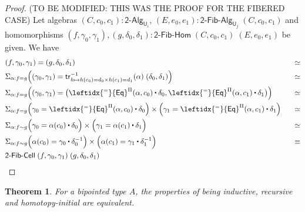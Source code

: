 \documentclass[reqno,10pt,a4paper,oneside]{amsart}
\newcommand{\sm}[1]{\Sigma_{#1}}
\newcommand{\happly}{\leftidx{^=}{\mathsf{Eq}}^{\Pi}}
\newcommand{\UU}{\mathsf{U}}
\newcommand{\BoolAlg}{\mathsf{2}\text{-}\mathsf{Alg}}
\newcommand{\BoolFibCell}{\mathsf{2}\text{-}\mathsf{Fib}\text{-}\mathsf{Cell}}
\newcommand{\BoolFibAlg}{\mathsf{2}\text{-}\mathsf{Fib}\text{-}\mathsf{Alg}}
\newcommand{\BoolFibHom}{\mathsf{2}\text{-}\mathsf{Fib}\text{-}\mathsf{Hom}}
\newcommand{\trans}{\mathsf{tr}}
\newcommand{\ct}{%
  \mathchoice{\mathbin{\raisebox{0.5ex}{$\displaystyle\centerdot$}}}%
             {\mathbin{\raisebox{0.5ex}{$\centerdot$}}}%
             {\mathbin{\raisebox{0.25ex}{$\scriptstyle\,\centerdot\,$}}}%
             {\mathbin{\raisebox{0.1ex}{$\scriptscriptstyle\,\centerdot\,$}}}}
\numberwithin{equation}{section}
\theoremstyle{mythm}
\newtheorem{theorem}{Theorem}[section]
\theoremstyle{mydef}
\theoremstyle{myrmk}
\begin{document}
\begin{proof}   (TO BE MODIFIED: THIS WAS THE PROOF FOR THE FIBERED CASE)
Let algebras $(C,c_0,c_1) : \BoolAlg_{\UU_i}$, $(E,e_0,e_1) : \BoolFibAlg_{\UU_j} \; (C,c_0,c_1)$ and homomorphisms $(f,\gamma_0,\gamma_1), (g,\delta_0,\delta_1) : \BoolFibHom \; (C,c_0,c_1) \; (E,e_0,e_1)$ be given. We have
\begin{alignat*}{4}
& (f,\gamma_0,\gamma_1) = (g,\delta_0,\delta_1) & \simeq \\
& \sm{\alpha : f = g} \Big((\gamma_0,\gamma_1) = \trans^{-1}_{h \mapsto h(c_0) = d_0 \times h(c_1) = d_1}(\alpha) \; (\delta_0,\delta_1) \Big) & \simeq \\
& \sm{\alpha : f = g} \Big((\gamma_0,\gamma_1) = \big(\happly(\alpha,c_0) \ct \delta_0, \happly(\alpha,c_1) \ct \delta_1\big) \Big) & \simeq \\
& \sm{\alpha : f = g} \Big(\gamma_0 = \happly(\alpha,c_0) \ct \delta_0\Big) \times \Big( \gamma_1 = \happly(\alpha,c_1) \ct \delta_1 \Big) & \;\;\; \simeq \\
& \sm{\alpha : f \sim g} \Big(\gamma_0 = \alpha(c_0) \ct \delta_0\Big) \times \Big(\gamma_1 = \alpha(c_1) \ct \delta_1 \Big) & \simeq \\
& \sm{\alpha : f \sim g} \Big(\alpha(c_0) = \gamma_0 \ct \delta^{-1}_0\Big) \times \Big(\alpha(c_1) = \gamma_1 \ct \delta^{-1}_1 \Big) & \equiv \\
& \BoolFibCell \; (f,\gamma_0,\gamma_1) \; (g,\delta_0,\delta_1)
\end{alignat*}
\end{proof}






\begin{theorem}\label{lem:BoolMainInt} For a bipointed type $A$, the properties of being inductive, recursive and homotopy-initial are equivalent.
\end{theorem}
\end{document}
